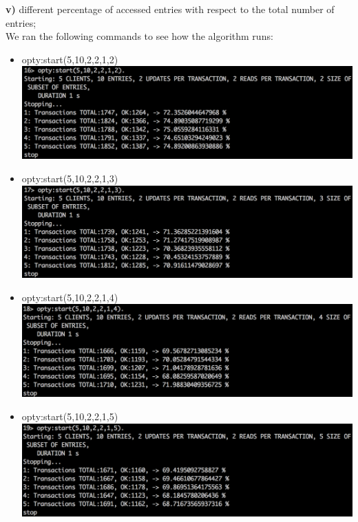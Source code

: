 \documentclass[a4paper, 11pt]{article}
\begin{document}
%
\textbf{v)} different percentage of accessed entries with respect to the total number of entries;\\
We ran the following commands to see how the algorithm runs:\\
\begin{itemize}
\item opty:start(5,10,2,2,1,2)\\
\includegraphics[scale=0.5]{images/exp-v-1.png} \\
\item opty:start(5,10,2,2,1,3)\\
\includegraphics[scale=0.5]{images/exp-v-2.png} \\
\item opty:start(5,10,2,2,1,4)\\
\includegraphics[scale=0.5]{images/exp-v-3.png} \\
\item opty:start(5,10,2,2,1,5)\\
\includegraphics[scale=0.5]{images/exp-v-4.png} \\

\end{itemize}
\end{document}
